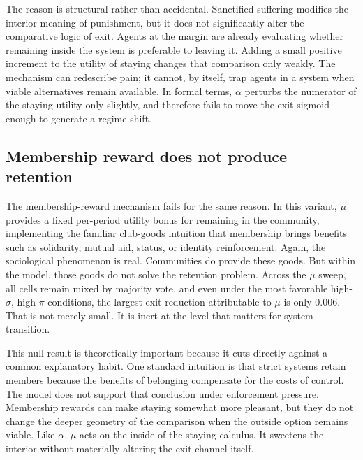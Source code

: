 \documentclass[12pt]{article}
\begin{document}
The reason is structural rather than accidental. Sanctified suffering modifies the interior meaning of punishment, but it does not significantly alter the comparative logic of exit. Agents at the margin are already evaluating whether remaining inside the system is preferable to leaving it. Adding a small positive increment to the utility of staying changes that comparison only weakly. The mechanism can redescribe pain; it cannot, by itself, trap agents in a system when viable alternatives remain available. In formal terms, $\alpha$ perturbs the numerator of the staying utility only slightly, and therefore fails to move the exit sigmoid enough to generate a regime shift.

\subsection{Membership reward does not produce retention}

The membership-reward mechanism fails for the same reason. In this variant, $\mu$ provides a fixed per-period utility bonus for remaining in the community, implementing the familiar club-goods intuition that membership brings benefits such as solidarity, mutual aid, status, or identity reinforcement. Again, the sociological phenomenon is real. Communities do provide these goods. But within the model, those goods do not solve the retention problem. Across the $\mu$ sweep, all cells remain mixed by majority vote, and even under the most favorable high-$\sigma$, high-$\pi$ conditions, the largest exit reduction attributable to $\mu$ is only 0.006. That is not merely small. It is inert at the level that matters for system transition.

This null result is theoretically important because it cuts directly against a common explanatory habit. One standard intuition is that strict systems retain members because the benefits of belonging compensate for the costs of control. The model does not support that conclusion under enforcement pressure. Membership rewards can make staying somewhat more pleasant, but they do not change the deeper geometry of the comparison when the outside option remains viable. Like $\alpha$, $\mu$ acts on the inside of the staying calculus. It sweetens the interior without materially altering the exit channel itself.

\end{document}
